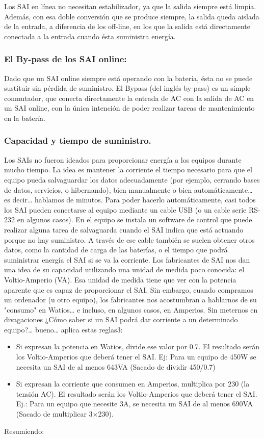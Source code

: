 \documentclass{article}
\begin{document}
Los SAI en línea no necesitan estabilizador, ya que la salida siempre está limpia. Además, con esa doble conversión que se produce siempre, la salida queda aislada de la entrada, a diferencia de los off-line, en los que la salida está directamente conectada a la entrada cuando ésta suministra energía.

\subsubsection{El By-pass de los SAI online:}
\label{sec:org0b0ae75}
Dado que un SAI online siempre está operando con la batería, ésta no se puede sustituir sin pérdida de suministro.
El Bypass (del inglés by-pass) es un simple conmutador, que conecta directamente la entrada de AC con la salida de AC en un SAI online, con la única intención de poder realizar tareas de mantenimiento en la batería.

\subsubsection{Capacidad y tiempo de suministro.}
\label{sec:orgfa09ea3}
Los SAIs no fueron ideados para proporcionar energía a los equipos durante mucho tiempo. La idea es mantener la corriente el tiempo necesario para que el equipo pueda salvaguardar los datos adecuadamente (por ejemplo, cerrando bases de datos, servicios, o hibernando), bien manualmente o bien automáticamente\ldots{} es decir\ldots{} hablamos de minutos.
Para poder hacerlo automáticamente, casi todos los SAI pueden conectarse al equipo mediante un cable USB (o un cable serie RS-232 en algunos casos). En el equipo se instala un software de control que puede realizar alguna tarea de salvaguarda cuando el SAI indica que está actuando porque no hay suministro.
A través de ese cable también se suelen obtener otros datos, como la cantidad de carga de las baterías, o el tiempo que podrá suministrar energía el SAI si se va la corriente.
Los fabricantes de SAI nos dan una idea de su capacidad utilizando una unidad de medida poco conocida: el Voltio-Amperio (VA). Esa unidad de medida tiene que ver con la potencia aparente que es capaz de proporcionar el SAI.
Sin embargo, cuando compramos un ordenador (u otro equipo), los fabricantes nos acostumbran a hablarnos de su "consumo" en Watios\ldots{} e incluso, en algunos casos, en Amperios. Sin meternos en divagaciones ¿Cómo saber si un SAI podrá dar corriente a un determinado equipo?\ldots{} bueno\ldots{} aplica estas reglas3:
\begin{itemize}
\item Si expresan la potencia en Watios, divide ese valor por 0.7. El resultado serán los Voltio-Amperios que deberá tener el SAI. Ej: Para un equipo de 450W se necesita un SAI de al menos 643VA (Sacado de dividir 450/0.7)
\item Si expresan la corriente que consumen en Amperios, multiplica por 230 (la tensión AC). El resultado serán los Voltio-Amperios que deberá tener el SAI. Ej.: Para un equipo que necesite 3A, se necesita un SAI de al menos 690VA (Sacado de multiplicar 3×230).
\end{itemize}
Resumiendo:
\end{document}
